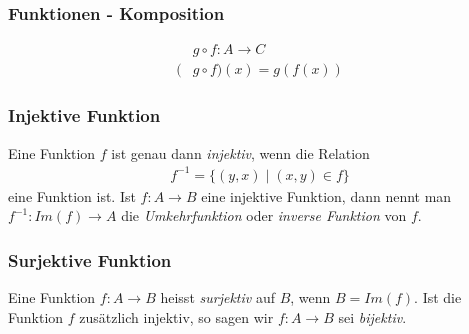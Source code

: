 \subsubsection{Funktionen - Komposition}%
\label{ssub:funktionen_koposition}
\begin{minipage}{0.9\linewidth}
	\begin{align*}
		  & g\circ f:A\to C      \\
		( & g\circ f)(x)=g(f(x))
	\end{align*}
\end{minipage}

\begin{minipage}[t]{0.45\linewidth}
	\subsubsection{Injektive Funktion}%
	\label{ssub:injektive_funktion}
	Eine Funktion $f$ ist genau dann \textit{injektiv}, wenn die Relation
	\begin{align*}
		f^{-1}=\{(y,x)\mid (x,y)\in f\}
	\end{align*}
	eine Funktion ist. Ist $f:A\to B$ eine injektive Funktion, dann nennt man $f^{-1}:Im(f)\to A$ die \textit{Umkehrfunktion} oder \textit{inverse Funktion} von $f$.
\end{minipage}
\hfill
\begin{minipage}[t]{0.45\linewidth}
	\subsubsection{Surjektive Funktion}%
	\label{ssub:injektive_funktion}
	Eine Funktion $f:A\to B$ heisst \textit{surjektiv} auf $B$, wenn $B=Im(f)$. Ist die Funktion $f$ zusätzlich injektiv, so sagen wir $f:A\to B$ sei \textit{bijektiv}.
\end{minipage}

